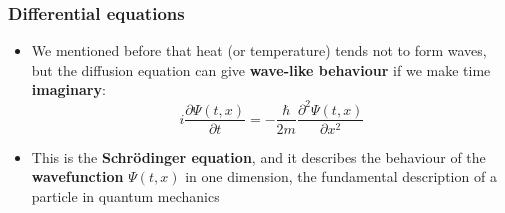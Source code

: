 \documentclass{beamer}
\begin{document}
\begin{frame}
  \frametitle{Differential equations}
  \begin{itemize}
    \item<1-> We mentioned before that heat (or temperature) tends not to form waves, but the diffusion equation can give \textbf{wave-like behaviour} if we make time \textbf{imaginary}:
      \begin{equation*}
	i\frac{\partial\Psi(t,x)}{\partial t}=-\frac{\hbar}{2m}\frac{\partial^2\Psi(t,x)}{\partial x^2}	
      \end{equation*}
    \item<2-> This is the \textbf{Schr\"odinger equation}, and it describes the behaviour of the \textbf{wavefunction} $\Psi(t,x)$ in one dimension, the fundamental description of a particle in quantum mechanics
  \end{itemize}
\end{frame}
\end{document}
